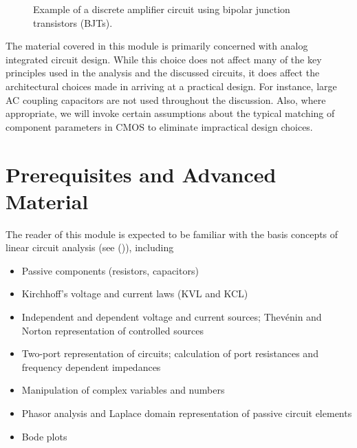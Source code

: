 \documentclass[
  11pt,
  letterpaper,
  abstract]{scrbook}
\begin{document}
\begin{figure}


\caption{\label{fig-1.14}Example of a discrete amplifier circuit using
bipolar junction transistors (BJTs).}

\end{figure}%

The material covered in this module is primarily concerned with analog
integrated circuit design. While this choice does not affect many of the
key principles used in the analysis and the discussed circuits, it does
affect the architectural choices made in arriving at a practical design.
For instance, large AC coupling capacitors are not used throughout the
discussion. Also, where appropriate, we will invoke certain assumptions
about the typical matching of component parameters in CMOS to eliminate
impractical design choices.

\section{Prerequisites and Advanced
Material}\label{prerequisites-and-advanced-material}

The reader of this module is expected to be familiar with the basis
concepts of linear circuit analysis (see
()), including

\begin{itemize}
\item
  Passive components (resistors, capacitors)
\item
  Kirchhoff's voltage and current laws (KVL and KCL)
\item
  Independent and dependent voltage and current sources; Thevénin and
  Norton representation of controlled sources
\item
  Two-port representation of circuits; calculation of port resistances
  and frequency dependent impedances
\item
  Manipulation of complex variables and numbers
\item
  Phasor analysis and Laplace domain representation of passive circuit
  elements
\item
  Bode plots
\end{itemize}
\end{document}
